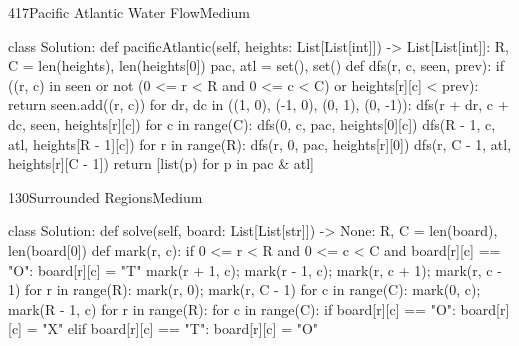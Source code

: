 \begin{problem}{417}{Pacific Atlantic Water Flow}{Medium}
\begin{code}
class Solution:
    def pacificAtlantic(self, heights: List[List[int]]) -> List[List[int]]:
        R, C = len(heights), len(heights[0])
        pac, atl = set(), set()
        def dfs(r, c, seen, prev):
            if ((r, c) in seen or not (0 <= r < R and 0 <= c < C)
                    or heights[r][c] < prev):
                return
            seen.add((r, c))
            for dr, dc in ((1, 0), (-1, 0), (0, 1), (0, -1)):
                dfs(r + dr, c + dc, seen, heights[r][c])
        for c in range(C):
            dfs(0, c, pac, heights[0][c])
            dfs(R - 1, c, atl, heights[R - 1][c])
        for r in range(R):
            dfs(r, 0, pac, heights[r][0])
            dfs(r, C - 1, atl, heights[r][C - 1])
        return [list(p) for p in pac & atl]
\end{code}
\end{problem}

\begin{problem}{130}{Surrounded Regions}{Medium}
\begin{code}
class Solution:
    def solve(self, board: List[List[str]]) -> None:
        R, C = len(board), len(board[0])
        def mark(r, c):
            if 0 <= r < R and 0 <= c < C and board[r][c] == "O":
                board[r][c] = "T"
                mark(r + 1, c); mark(r - 1, c); mark(r, c + 1); mark(r, c - 1)
        for r in range(R):
            mark(r, 0); mark(r, C - 1)
        for c in range(C):
            mark(0, c); mark(R - 1, c)
        for r in range(R):
            for c in range(C):
                if board[r][c] == "O":
                    board[r][c] = "X"
                elif board[r][c] == "T":
                    board[r][c] = "O"
\end{code}
\end{problem}

